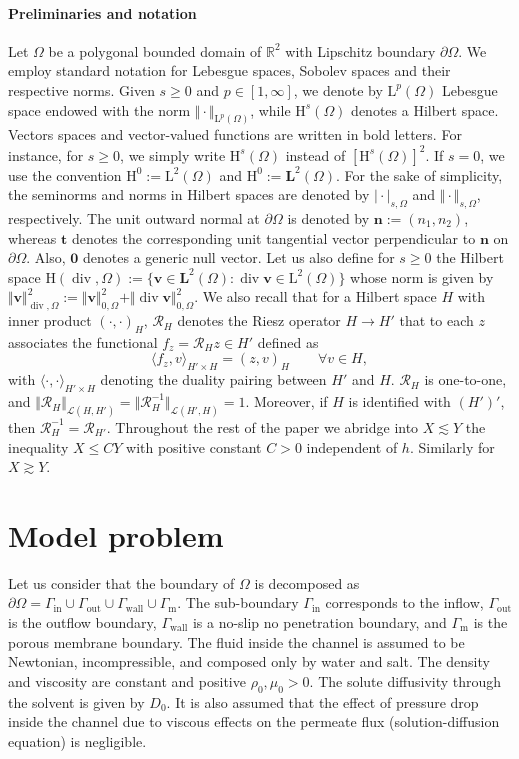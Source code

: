 \documentclass[onefignum,onetabnum,reqno,a4paper,final]{siamart250211}
\def\O{\Omega}
\newcommand\bv{\boldsymbol{v}}
\newcommand\bn{\boldsymbol{n}}
\newcommand\0{\mathbf{0}}
\newcommand\R{\mathbb{R}}
\renewcommand\H{\mathrm{H}}
\renewcommand\L{\mathrm{L}}
\newcommand\bH{\boldsymbol{\mathrm{H}}}
\renewcommand\O{\Omega}
\newcommand\DO{\partial\O}
\newcommand\Gm{\Gamma_{\mathrm{m}}}
\newcommand\Gi{\Gamma_{\mathrm{in}}}
\newcommand\Go{\Gamma_{\mathrm{out}}}
\newcommand\Gw{\Gamma_{\mathrm{wall}}}
\renewcommand\div{\mathop{\mathrm{div}}\nolimits}
\newcommand\HsO{\H^s(\O)}
\numberwithin{figure}{section}
\numberwithin{table}{section}
\begin{document}
	\paragraph{Preliminaries and notation}
	Let $\O$ be a polygonal  bounded domain of $\R^2$ with Lipschitz boundary $\DO$.  
	   We employ standard notation for Lebesgue spaces, Sobolev spaces and their respective norms. Given $s\geq 0$ and $p\in[1,\infty]$, we denote by $\L^p(\O)$ Lebesgue space endowed with the norm $\Vert\cdot\Vert_{\L^p(\O)}$, while $\HsO$ denotes a Hilbert space. Vectors spaces and vector-valued functions are written in bold letters. For instance, for $s\geq 0$, we simply write $\bH^s(\O)$ instead of $[\H^s(\O)]^2$. If $s=0$, we use the convention $\H^0:=\L^2(\O)$ and $\bH^0:=\mathbf{L}^2(\O)$. For the sake of simplicity, the seminorms and norms in Hilbert spaces are denoted by $\vert \cdot\vert_{s,\Omega}$ and $\Vert\cdot\Vert_{s,\O}$, respectively. The unit outward normal at $\partial\Omega$ is denoted by $\bn:=(n_1,n_2)$, whereas $\boldsymbol{t}$  denotes the corresponding unit tangential vector 
    perpendicular to $\bn$ on $\partial\Omega$. Also, $\mathbf{0}$ denotes a generic null vector.	Let us also define for $s\geq 0$ the Hilbert space $\H(\div,\O):=\{\bv\in\mathbf{L}^2(\O):\div\bv\in\L^2(\O)\}$ whose norm is given by $\Vert\bv\Vert_{\div,\O}^2:=\Vert\bv\Vert_{0,\O}^2+\Vert\div\bv\Vert_{0,\O}^2$.
 We also recall that for a Hilbert space $H$ with inner product $(\cdot,\cdot)_H$,  $\mathcal{R}_H$ denotes the Riesz operator $H\rightarrow H'$  that to each $z$ associates the functional $f_z=\mathcal{R}_H z\in H'$ defined as
         $$
         \langle f_z,v\rangle_{H'\times H}=(z,v)_H\qquad \forall v \in H,
         $$
         with $\langle\cdot,\cdot\rangle_{H'\times H}$ denoting the duality pairing between $H'$ and $H$.
    $\mathcal{R}_H$ is one-to-one, and $\Vert \mathcal{R}_H\Vert_{\mathcal{L}(H,H')}=\Vert \mathcal{R}_H^{-1}\Vert_{\mathcal{L}(H',H)}=1$. Moreover, if $H$ is identified with $(H')'$, then $\mathcal{R}_H^{-1}=\mathcal{R}_{H'}$. Throughout the rest of the paper we abridge into $X\lesssim Y$ the inequality $X\leq CY$ with positive constant $C>0$ independent of $h$. Similarly for $X\gtrsim Y$. 

	\section{Model problem}\label{sec:model}
    Let us consider that the boundary of $\Omega$  is decomposed as $\partial\O=\Gi\cup\Go\cup\Gw\cup\Gm$. The sub-boundary $\Gi$ corresponds to the inflow, $\Go$ is the outflow boundary, $\Gw$ is a no-slip no penetration boundary, and $\Gm$ is the porous membrane boundary.
	The fluid inside the channel is assumed to be Newtonian, incompressible, and composed only by water and salt. The density and viscosity are constant and positive $\rho_0, \mu_0>0$. The solute diffusivity through the solvent is given by $D_{0}$. It is also assumed that the effect of pressure drop inside the channel due to viscous effects on the permeate flux (solution-diffusion equation) is negligible.
\end{document}
